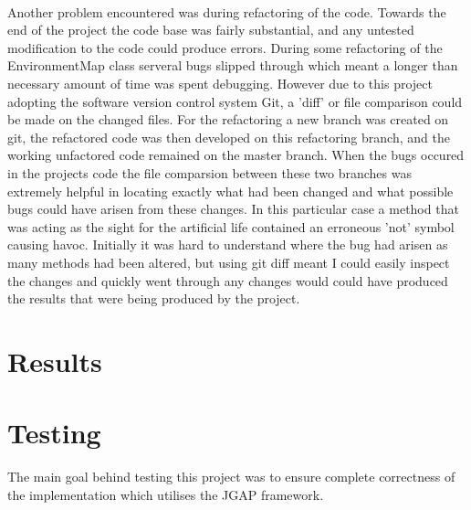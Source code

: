 \documentclass[12pt]{article}
\begin{document}
\paragraph{}
Another problem encountered was during refactoring of the code. Towards the end of the project the code base was fairly substantial, and any
untested modification to the code could produce errors. During some refactoring of the EnvironmentMap class serveral bugs slipped through
which meant a longer than necessary amount of time was spent debugging. However due to this project adopting the software version control system
Git, a 'diff' or file comparison could be made on the changed files. For the refactoring a new branch was created on git, the refactored code
was then developed on this refactoring branch, and the working unfactored code remained on the master branch. When the bugs occured in the
projects code the file comparsion between these two branches was extremely helpful in locating exactly what had been changed and what
possible bugs could have arisen from these changes. In this particular case a method that was acting as the sight for the artificial life
contained an erroneous 'not' symbol causing havoc. Initially it was hard to understand where the bug had arisen as many methods had been
altered, but using git diff meant I could easily inspect the changes and quickly went through any changes would could have produced the
results that were being produced by the project.

\section{Results}

\section{Testing}
The main goal behind testing this project was to ensure complete correctness of the implementation which utilises the JGAP framework.
\end{document}
